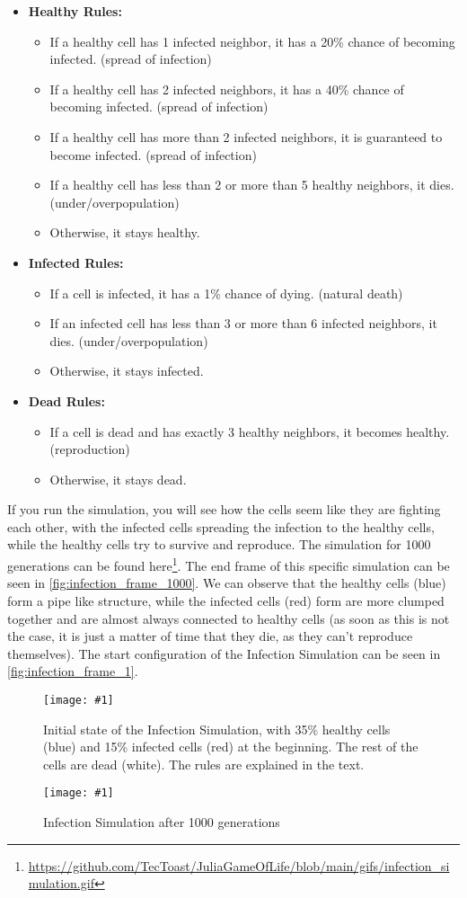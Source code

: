 \documentclass[a4paper,12pt]{llncs}
\numberwithin{equation}{section}
\newcommand{\imagewithwidth}[5]{
  \begin{figure}[htbp]%
    \begin{center}%
      \texttt{[image: \#1]}%
      \caption[#5]{#4}%
      \label{#3}%
    \end{center}%
  \end{figure}
}
\begin{document}
\begin{itemize}
  \item \textbf{Healthy Rules:}
        \begin{itemize}
          \item If a healthy cell has 1 infected neighbor, it has a 20\% chance of becoming infected. (spread of infection)
          \item If a healthy cell has 2 infected neighbors, it has a 40\% chance of becoming infected. (spread of infection)
          \item If a healthy cell has more than 2 infected neighbors, it is guaranteed to become infected. (spread of infection)
          \item If a healthy cell has less than 2 or more than 5 healthy neighbors, it dies. (under/overpopulation)
          \item Otherwise, it stays healthy.
        \end{itemize}
  \item \textbf{Infected Rules:}
        \begin{itemize}
          \item If a cell is infected, it has a 1\% chance of dying. (natural death)
          \item If an infected cell has less than 3 or more than 6 infected neighbors, it dies. (under/overpopulation)
          \item Otherwise, it stays infected.
        \end{itemize}
  \item \textbf{Dead Rules:}
        \begin{itemize}
          \item If a cell is dead and has exactly 3 healthy neighbors, it becomes healthy. (reproduction)
          \item Otherwise, it stays dead.
        \end{itemize}
\end{itemize}
If you run the simulation, you will see how the cells seem like they are fighting each other, with the infected cells spreading the infection to the healthy cells, while the healthy cells try to survive and reproduce.
The simulation for 1000 generations can be found here\footnote{\url{https://github.com/TecToast/JuliaGameOfLife/blob/main/gifs/infection_simulation.gif}}. The end frame of this specific simulation can be seen in \autoref{fig:infection_frame_1000}.
We can observe that the healthy cells (blue) form a pipe like structure, while the infected cells (red) form are more clumped together and are almost always connected to healthy cells (as soon as this is not the case, it is just a matter of time that they die, as they can't reproduce themselves).
The start configuration of the Infection Simulation can be seen in \autoref{fig:infection_frame_1}.
\imagewithwidth{figures/infection_frame_1}{0.5\textwidth}{fig:infection_frame_1}{Initial state of the Infection Simulation, with 35\% healthy cells (blue) and 15\% infected cells (red) at the beginning. The rest of the cells are dead (white). The rules are explained in the text.}{}
\imagewithwidth{figures/infection_frame_1000}{0.5\textwidth}{fig:infection_frame_1000}{Infection Simulation after 1000 generations}{}
\end{document}
